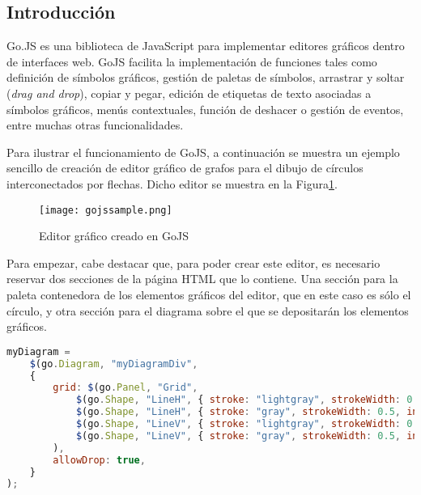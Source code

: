 \subsection{Introducción}

Go.JS \cite{gojs} es una biblioteca de JavaScript para implementar editores gráficos dentro de interfaces web. GoJS facilita la implementación de funciones tales como definición de símbolos gráficos, gestión de paletas de símbolos, arrastrar y soltar (\emph{drag and drop}), copiar y pegar, edición de etiquetas de texto asociadas a símbolos gráficos, menús contextuales, función de deshacer o gestión de eventos, entre muchas otras funcionalidades.

Para ilustrar el funcionamiento de GoJS, a continuación se muestra un ejemplo sencillo de creación de editor gráfico de grafos
para el dibujo de círculos interconectados por flechas. Dicho editor se muestra en la Figura\ref{fig:gojssample}.


\begin{figure}[!tb]
	\centering
	\texttt{[image: gojssample.png]}
	\caption{Editor gráfico creado en GoJS}
    \label{fig:gojssample}
\end{figure}

Para empezar, cabe destacar que, para poder crear este editor, es necesario reservar dos secciones de la página HTML que lo contiene. Una sección para la paleta contenedora de los elementos gráficos del editor, que en este caso es sólo el círculo, y otra sección para el diagrama sobre el que se depositarán los elementos gráficos. 

\begin{lstlisting}[language=JavaScript]
myDiagram =
	$(go.Diagram, "myDiagramDiv",  
	{
		grid: $(go.Panel, "Grid",
			$(go.Shape, "LineH", { stroke: "lightgray", strokeWidth: 0.5 }),
			$(go.Shape, "LineH", { stroke: "gray", strokeWidth: 0.5, interval: 10 }),
			$(go.Shape, "LineV", { stroke: "lightgray", strokeWidth: 0.5 }),
			$(go.Shape, "LineV", { stroke: "gray", strokeWidth: 0.5, interval: 10 })
		),
		allowDrop: true,         
	}
);
\end{lstlisting}

